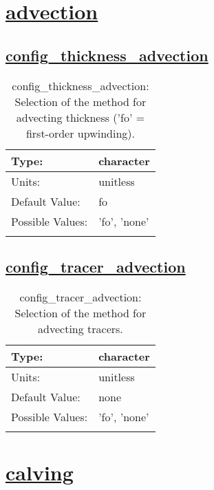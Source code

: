 \section[advection]{\hyperref[sec:nm_tab_advection]{advection}}
\label{sec:nm_sec_advection}
\subsection[config\_thickness\_advection]{\hyperref[sec:nm_tab_advection]{config\_thickness\_advection}}
\label{subsec:nm_sec_config_thickness_advection}
\begin{center}
\begin{longtable}{| p{2.0in} || p{4.0in} |}
    \hline
    Type: & character \\
    \hline
    Units: & \si{unitless} \\
    \hline
    Default Value: & fo \\
    \hline
    Possible Values: & 'fo', 'none' \\
    \hline
    \caption{config\_thickness\_advection: Selection of the method for advecting thickness ('fo' = first-order upwinding).}
\end{longtable}
\end{center}
\subsection[config\_tracer\_advection]{\hyperref[sec:nm_tab_advection]{config\_tracer\_advection}}
\label{subsec:nm_sec_config_tracer_advection}
\begin{center}
\begin{longtable}{| p{2.0in} || p{4.0in} |}
    \hline
    Type: & character \\
    \hline
    Units: & \si{unitless} \\
    \hline
    Default Value: & none \\
    \hline
    Possible Values: & 'fo', 'none' \\
    \hline
    \caption{config\_tracer\_advection: Selection of the method for advecting tracers.}
\end{longtable}
\end{center}
\section[calving]{\hyperref[sec:nm_tab_calving]{calving}}
\label{sec:nm_sec_calving}

